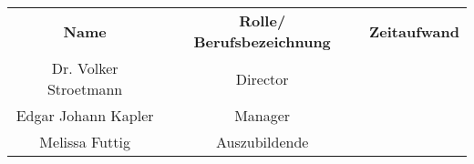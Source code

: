 \begin{tabular}{|c|c|c|}
    \rowcolor{heading}\textbf{Name} & \textbf{Rolle/ Berufsbezeichnung} & \textbf{Zeitaufwand} \\
    Dr. Volker Stroetmann & Director &  \\
    \rowcolor{odd}Edgar Johann Kapler & Manager &  \\
    Melissa Futtig & Auszubildende &  \\
    \hline
\end{tabular}